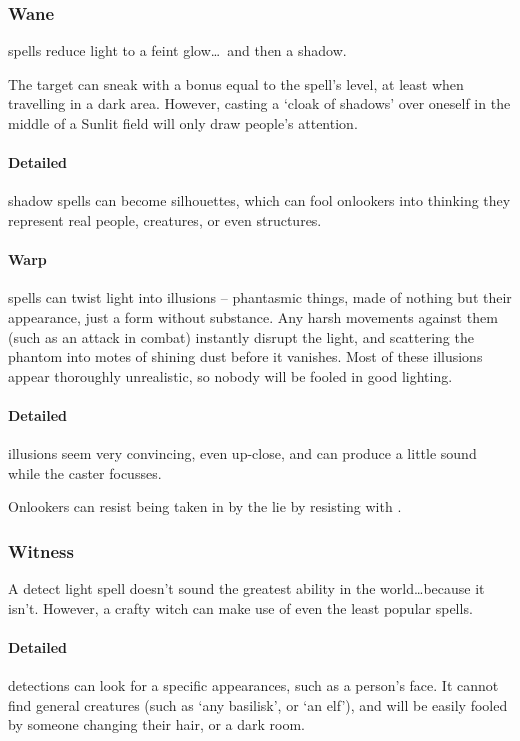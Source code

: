 \begin{multicols}{2}
\subsubsection{Wane}
spells reduce light to a feint glow\ldots~and then a shadow.

The target can sneak with a bonus equal to the spell's level, at least when travelling in a dark area.
However, casting a `cloak of shadows' over oneself in the middle of a Sunlit field will only draw people's attention.

\paragraph{Detailed}
shadow spells can become silhouettes, which can fool onlookers into thinking they represent real people, creatures, or even structures.

\paragraph{Warp}
spells can twist light into illusions -- phantasmic things, made of nothing but their appearance, just a form without substance.
Any harsh movements against them (such as an attack in combat) instantly disrupt the light, and scattering the phantom into motes of shining dust before it vanishes.
Most of these illusions appear thoroughly unrealistic, so nobody will be fooled in good lighting.

\paragraph{Detailed}
illusions seem very convincing, even up-close, and can produce a little sound while the caster focusses.

Onlookers can resist being taken in by the lie by resisting with .

\subsubsection{Witness}
A detect light spell doesn't sound the greatest ability in the world\ldots because it isn't.
However, a crafty witch can make use of even the least popular spells.

\paragraph{Detailed}
detections can look for a specific appearances, such as a person's face.
It cannot find general creatures (such as `any basilisk', or `an elf'), and will be easily fooled by someone changing their hair, or a dark room.


\end{multicols}
